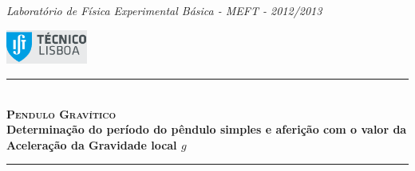 \documentclass[a4paper,12pt]{article}      %
\author{Prof. Bernardo B. Carvalho}
\date{ Setembro 2012}
\newcommand{\HRule}{\rule{\linewidth}{0.5mm}}
\begin{document}
 
\thispagestyle{empty}
{\small\it Laboratório de Física Experimental Básica - MEFT - 2012/2013}

\includegraphics[width=0.2\textwidth]{./logo-ist}%
	
	\HRule \\[0.5cm]
	{ \huge   \bfseries \textsc{ Pendulo Gravítico } }\\[0.4cm]
	{ \large \bfseries Determinação do período do pêndulo simples e aferição com o valor da Aceleração da Gravidade local $g$  }\\
	\HRule \\%
	
%	 

\end{document}
